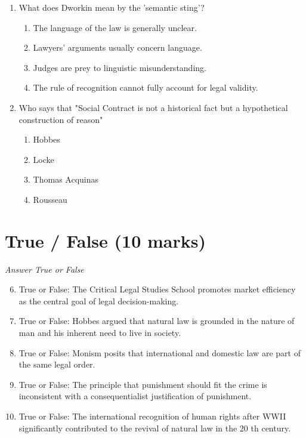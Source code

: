 \documentclass[12pt]{article}
\begin{document}
\begin{enumerate}[label=\arabic*.]
\item What does Dworkin mean by the 'semantic sting'?
\begin{enumerate}[label=(\alph*)]
    \item The language of the law is generally unclear.
    \item Lawyers' arguments usually concern language.
    \item Judges are prey to linguistic misunderstanding.
    \item The rule of recognition cannot fully account for legal validity.
\end{enumerate}
\item Who says that "Social Contract is not a historical fact but a hypothetical construction of reason"
\begin{enumerate}[label=(\alph*)]
    \item Hobbes
    \item Locke
    \item Thomas Acquinas
    \item Rousseau
\end{enumerate}
\end{enumerate}

\section*{True / False (10 marks)}
\textit{Answer True or False}
\begin{enumerate}[label=\arabic*.]
\setcounter{enumi}{5}
\item True or False: The Critical Legal Studies School promotes market efficiency as the central goal of legal decision-making.
\item True or False: Hobbes argued that natural law is grounded in the nature of man and his inherent need to live in society.
\item True or False: Monism posits that international and domestic law are part of the same legal order.
\item True or False: The principle that punishment should fit the crime is inconsistent with a consequentialist justification of punishment.
\item True or False: The international recognition of human rights after WWII significantly contributed to the revival of natural law in the 20 th century.
\end{enumerate}
\end{document}
